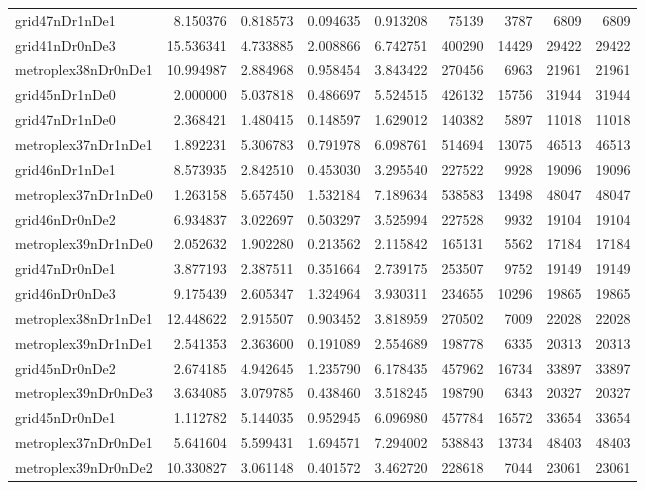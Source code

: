 \begin{longtable}{|l|r|r|r|r|r|r|r|r|}
grid47nDr1nDe1 & 8.150376 & 0.818573 & 0.094635 & 0.913208 & 75139 & 3787 & 6809 & 6809 \\
grid41nDr0nDe3 & 15.536341 & 4.733885 & 2.008866 & 6.742751 & 400290 & 14429 & 29422 & 29422 \\
metroplex38nDr0nDe1 & 10.994987 & 2.884968 & 0.958454 & 3.843422 & 270456 & 6963 & 21961 & 21961 \\
grid45nDr1nDe0 & 2.000000 & 5.037818 & 0.486697 & 5.524515 & 426132 & 15756 & 31944 & 31944 \\
grid47nDr1nDe0 & 2.368421 & 1.480415 & 0.148597 & 1.629012 & 140382 & 5897 & 11018 & 11018 \\
metroplex37nDr1nDe1 & 1.892231 & 5.306783 & 0.791978 & 6.098761 & 514694 & 13075 & 46513 & 46513 \\
grid46nDr1nDe1 & 8.573935 & 2.842510 & 0.453030 & 3.295540 & 227522 & 9928 & 19096 & 19096 \\
metroplex37nDr1nDe0 & 1.263158 & 5.657450 & 1.532184 & 7.189634 & 538583 & 13498 & 48047 & 48047 \\
grid46nDr0nDe2 & 6.934837 & 3.022697 & 0.503297 & 3.525994 & 227528 & 9932 & 19104 & 19104 \\
metroplex39nDr1nDe0 & 2.052632 & 1.902280 & 0.213562 & 2.115842 & 165131 & 5562 & 17184 & 17184 \\
grid47nDr0nDe1 & 3.877193 & 2.387511 & 0.351664 & 2.739175 & 253507 & 9752 & 19149 & 19149 \\
grid46nDr0nDe3 & 9.175439 & 2.605347 & 1.324964 & 3.930311 & 234655 & 10296 & 19865 & 19865 \\
metroplex38nDr1nDe1 & 12.448622 & 2.915507 & 0.903452 & 3.818959 & 270502 & 7009 & 22028 & 22028 \\
metroplex39nDr1nDe1 & 2.541353 & 2.363600 & 0.191089 & 2.554689 & 198778 & 6335 & 20313 & 20313 \\
grid45nDr0nDe2 & 2.674185 & 4.942645 & 1.235790 & 6.178435 & 457962 & 16734 & 33897 & 33897 \\
metroplex39nDr0nDe3 & 3.634085 & 3.079785 & 0.438460 & 3.518245 & 198790 & 6343 & 20327 & 20327 \\
grid45nDr0nDe1 & 1.112782 & 5.144035 & 0.952945 & 6.096980 & 457784 & 16572 & 33654 & 33654 \\
metroplex37nDr0nDe1 & 5.641604 & 5.599431 & 1.694571 & 7.294002 & 538843 & 13734 & 48403 & 48403 \\
metroplex39nDr0nDe2 & 10.330827 & 3.061148 & 0.401572 & 3.462720 & 228618 & 7044 & 23061 & 23061 \\

\end{longtable}
